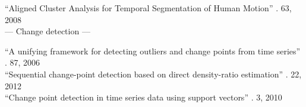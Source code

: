 
``Aligned Cluster Analysis for Temporal Segmentation of Human Motion'' \cite{zhou2008aligned}. 63, 2008 \\



--- Change detection ---

``A unifying framework for detecting outliers and change points from time series'' \cite{takeuchi2006unifying}. 87, 2006 \\







``Sequential change-point detection based on direct density-ratio estimation'' \cite{kawahara2012sequential}. 22, 2012 \\

``Change point detection in time series data using support vectors'' \cite{camci2010change}. 3, 2010 \\

